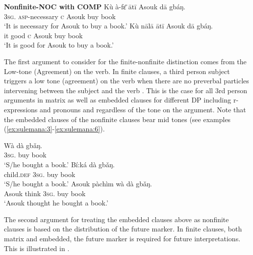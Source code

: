 \documentclass[output=paper,colorlinks,citecolor=brown]{langscibook}
\begin{document}
\ea%
    \label{ex:sulemana:6}
    {\bf{Nonfinite-NOC with COMP}}
    \ea%
    \label{ex:sulemana:6a}
    \gll    Kù à-fɛ̄ ātī Asouk dā gbáŋ.\\
            \textsc{3sg}. \textsc{asp}-necessary \textsc{c} Asouk buy book\\
    \glt    `It is necessary for Asouk to buy a book.' 
    \ex%
    \label{ex:sulemana:6b}
    \gll    Kù nālā ātī Asouk dā gbáŋ.\\
            it good \textsc{c} Asouk buy book\\
    \glt    `It is good for Asouk to buy a book.' 
    \z
\z

The first argument to consider for the finite-nonfinite distinction comes from the Low-tone (Agreement) on the verb. In finite clauses, a third person subject triggers a low tone (agreement) on the verb when there are no preverbal particles intervening between the subject and the verb . This is the case for all 3rd person arguments in matrix as well as embedded clauses for different DP including r-expressions and pronouns and regardless of the tone on the argument. Note that the embedded clauses of the nonfinite clauses bear mid tones (see examples (\ref{ex:sulemana:3}-\ref{ex:sulemana:6}). 

\ea%
    \label{ex:sulemana:7}
    \ea%
    \label{ex:sulemana:7a}
    \gll    Wà dà gbǎŋ.  \\
            \textsc{3sg}.  buy book\\
    \glt    `S/he bought a book.'
    \ex%
    \label{ex:sulemana:7b}
    \gll    Bí:ká dà gbǎŋ.  \\
            child.\textsc{def} \textsc{3sg}.  buy book\\
    \glt    `S/he bought a book.' 
    \ex%
    \label{ex:sulemana:7c}
    \gll    Asouk pàchìm wà dà gbǎŋ.  \\
            Asouk think \textsc{3sg}. buy book\\
    \glt    `Asouk thought he bought a book.' 
    \z
\z

The second argument for treating the embedded clauses above as nonfinite clauses is based on the distribution of the future marker. In finite clauses, both matrix and embedded, the future marker is required for future interpretations. This is illustrated in .
\end{document}
